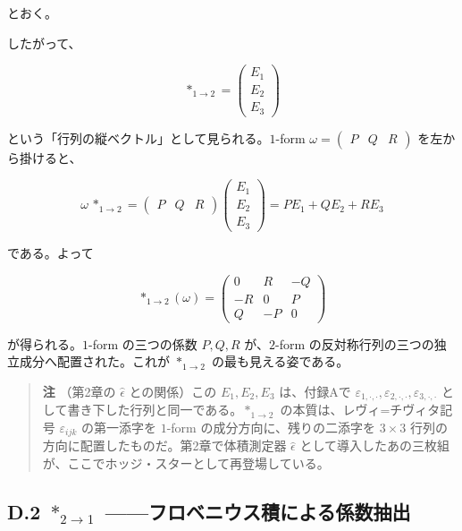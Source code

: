 \documentclass[a4paper,12pt,openany]{book}
\begin{document}
とおく。

したがって、

\[
\ast_{1\to2}
=
\begin{pmatrix}
E_1\\
E_2\\
E_3
\end{pmatrix}
\]

という「行列の縦ベクトル」として見られる。\(1\)-form
\(\omega=\begin{pmatrix}P&Q&R\end{pmatrix}\) を左から掛けると、

\[
\omega\,\ast_{1\to2}
=
\begin{pmatrix}P&Q&R\end{pmatrix}
\begin{pmatrix}
E_1\\
E_2\\
E_3
\end{pmatrix}
=
P E_1+Q E_2+R E_3
\]

である。よって

\[
\ast_{1\to2}(\omega)
=
\begin{pmatrix}
0 & R & -Q \\
-R & 0 & P \\
Q & -P & 0
\end{pmatrix}
\]

が得られる。\(1\)-form の三つの係数 \(P,Q,R\) が、\(2\)-form
の反対称行列の三つの独立成分へ配置された。これが \(\ast_{1\to2}\)
の最も見える姿である。

\begin{quote}
\textbf{注} （第2章の \(\widehat{\epsilon}\) との関係）この
\(E_1,E_2,E_3\) は、付録Aで
\(\varepsilon_{1,\cdot,\cdot},\varepsilon_{2,\cdot,\cdot},\varepsilon_{3,\cdot,\cdot}\)
として書き下した行列と同一である。\(\ast_{1\to2}\)
の本質は、レヴィ=チヴィタ記号 \(\varepsilon_{ijk}\) の第一添字を
\(1\)-form の成分方向に、残りの二添字を \(3\times3\)
行列の方向に配置したものだ。第2章で体積測定器 \(\widehat{\epsilon}\)
として導入したあの三枚組が、ここでホッジ・スターとして再登場している。
\end{quote}

\hypertarget{d.2-ast_2to1-ux30d5ux30edux30d9ux30cbux30a6ux30b9ux7a4dux306bux3088ux308bux4fc2ux6570ux62bdux51fa}{%
\subsection*{\texorpdfstring{D.2 \(\ast_{2\to1}\)
——フロベニウス積による係数抽出}{D.2 \textbackslash ast\_\{2\textbackslash to1\} ——フロベニウス積による係数抽出}}\label{d.2-ast_2to1-ux30d5ux30edux30d9ux30cbux30a6ux30b9ux7a4dux306bux3088ux308bux4fc2ux6570ux62bdux51fa}}
\end{document}
